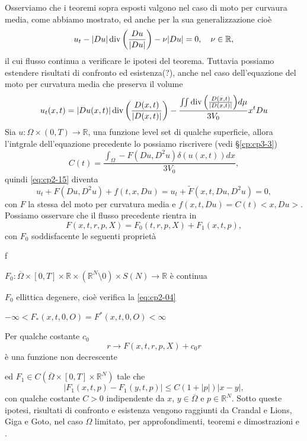\begin{osservazione}
Osserviamo che i teoremi sopra esposti valgono nel caso di moto per curvaura media, come abbiamo mostrato,  ed anche per la sua  generalizzazione cioè
\[
u_t -|Du|\operatorname{div}\left(\frac{Du}{|Du|}\right) - \nu|Du| = 0,\quad\nu\in\mathbb{R},
\]
il cui flusso continua a verificare le ipotesi del teorema.
 Tuttavia possiamo estendere risultati di confronto ed esistenza(?), anche nel caso dell'equazione del moto per curvatura media che preserva il volume
\begin{equation}
  \label{eq:cp2-15}
  u_t(x,t)=|Du(x,t)|\operatorname{div}{\left(\frac{D(x,t)}{|D(x,t)|}\right)}-\frac{\iint\operatorname{div}{\left(\frac{D(x,t)}{|D(x,t)|}\right)}d\mu}{3V_0}x^tDu
\end{equation}
Sia $u:\Omega\times(0,T)\to\mathbb{R}$, una funzione level set di qualche superficie, allora l'intgrale dell'equazione precedente lo possiamo riscrivere (vedi §\ref{cp:cp3-3})
\[
C(t)=\frac{\int_{\Omega}-F(Du,D^2u)\delta(u(x,t))dx}{3V_0},
\]
quindi \eqref{eq:cp2-15} diventa
\[
u_t + F(Du,D^2u) + f(t,x,Du) = u_t +\tilde{F}(x,t,Du,D^2u)=0,
\]
con $F$ la stessa del moto per curvatura media e $f(x,t,Du)=C(t)<x,Du>$.
Possiamo osservare che il flusso precedente rientra in 
\begin{equation}
\label{eq:cp2-16}
F(x,t,r,p,X) = F_0(t,r,p,X)+F_1(x,t,p),
\end{equation}
con $F_0$ soddisfacente le seguenti proprietà
\begin{enump}{f}
  \item $F_0:\overline{\Omega}\times[0,T]\times\mathbb{R}\times(\mathbb{R}^N\setminus{0})\times S(N)\to\mathbb{R}$ è continua
  \item $F_0$ ellittica degenere, cioè verifica la \eqref{eq:cp2-04}
  \item $ -\infty<F_*(x,t,0,O) = F^*(x,t,0,O)<\infty$
  \item Per qualche costante $c_0$ 
\[
      r\to F(x,t,r,p,X)+c_0r
\]
è una funzione non decrescente
\end{enump}
ed $F_1\in C(\overline{\Omega}\times[0,T]\times\mathbb{R}^N)$ tale che
\[
|F_1(x,t,p)-F_1(y,t,p)|\leq C(1+|p|)|x-y|,
\]
con qualche costante $C>0$ indipendente da $x$, $y\in\overline{\Omega}$ e $p\in\mathbb{R}^N$. Sotto queste ipotesi, risultati di confronto e esistenza vengono raggiunti da Crandal e Lions, Giga e Goto, nel caso $\Omega$ limitato, per approfondimenti, teoremi e dimostrazioni \cite[vedi][§3]{giga:main} e \cite[][§8]{crand:lion}.
\end{osservazione}



